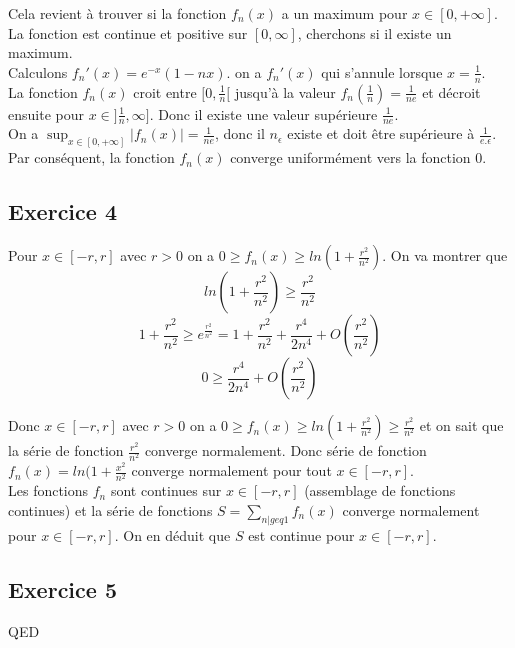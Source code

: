 \documentclass[]{book}
\theoremstyle{definition}
\begin{document}
Cela revient \`a trouver si la fonction $f_n(x)$ a un maximum pour $x \in [0,+\infty]$.\\
La fonction est continue et positive sur $[0,\infty]$, cherchons si il existe un maximum.\\

Calculons $f_{n}'(x) = e^{-x}(1-nx)$. on a $f_{n}'(x)$ qui s'annule lorsque $x = \frac{1}{n}$.\\

La fonction $f_{n}(x)$ croit entre $[0,\frac{1}{n}[$ jusqu'\`a la valeur $f_n(\frac{1}{n}) = \frac{1}{ne}$ et d\'ecroit ensuite pour $x \in ]\frac{1}{n}, \infty]$. Donc il existe une valeur sup\'erieure $\frac{1}{ne}$. \\

On a $\sup_{x \in [0,+\infty]}|f_n(x)| = \frac{1}{ne}$, donc il $n_{\epsilon}$  existe et doit \^etre sup\'erieure \`a $\frac{1}{e.\epsilon}$. Par cons\'equent, la fonction $f_n(x)$ converge uniform\'ement vers la fonction $0$. 



\subsection*{Exercice 4}
Pour $x \in [-r,r]$ avec $r > 0$ on a $0 \geq f_n(x) \geq ln\left(1+\frac{r^2}{n^2}\right)$. On va montrer que 
$$ln\left(1+\frac{r^2}{n^2}\right) \geq \frac{r^2}{n^2}$$
$$1+\frac{r^2}{n^2} \geq e^{\frac{r^2}{n^2}} = 1 + \frac{r^2}{n^2} + \frac{r^4}{2n^4} + O(\frac{r^2}{n^2})$$
$$0 \geq \frac{r^4}{2n^4} + O(\frac{r^2}{n^2})$$

Donc $x \in [-r,r]$ avec $r > 0$ on a $0 \geq f_n(x) \geq ln\left(1+\frac{r^2}{n^2}\right) \geq \frac{r^2}{n^2}$ et on sait que la s\'erie de fonction $\frac{r^2}{n^2}$ converge normalement. Donc s\'erie de fonction $f_n(x) = ln(1+\frac{x^2}{n^2}$ converge normalement pour tout $x \in [-r, r]$.\\

Les fonctions $f_n$ sont continues sur $x \in [-r,r]$ (assemblage de fonctions continues) et la s\'erie de fonctions $S = \sum_{n |geq 1}{f_n(x)}$ converge normalement pour $x \in [-r,r]$. On en d\'eduit que $S$ est continue pour $x \in [-r,r]$. 


\subsection*{Exercice 5}
 


QED
\end{document}
